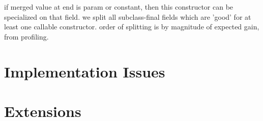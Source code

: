 \documentclass{acmconf}
\begin{document}
if merged value at end is param or constant, then this constructor
can be specialized on that field.  we split all subclass-final fields
which are 'good' for at least one callable constructor.  order of
splitting is by magnitude of expected gain, from profiling.

\section{Implementation Issues}


\section{Extensions} %
\end{document}

